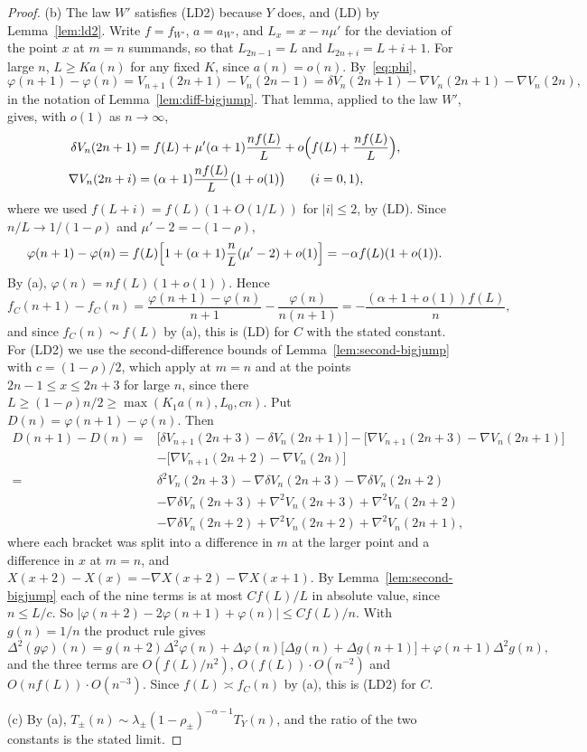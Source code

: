 \begin{proof}
(b) The law $W'$ satisfies (LD2) because $Y$ does, and (LD) by Lemma~\ref{lem:ld2}. Write
$f=f_{W'}$, $a=a_{W'}$, and $L_x=x-n\mu'$ for the deviation of the point $x$ at $m=n$
summands, so that $L_{2n-1}=L$ and $L_{2n+i}=L+i+1$. For large $n$, $L\ge Ka(n)$ for any fixed
$K$, since $a(n)=o(n)$. By~\eqref{eq:phi},
\[
 \varphi(n+1)-\varphi(n)=V_{n+1}(2n+1)-V_n(2n-1)
 =\delta V_n(2n+1)-\nabla V_n(2n+1)-\nabla V_n(2n),
\]
in the notation of Lemma~\ref{lem:diff-bigjump}. That lemma, applied to the law $W'$, gives,
with $o(1)$ as $n\to\infty$,
\begin{align*}
 \delta V_n(2n+1)&=f(L)+\mu'(\alpha+1)\frac{nf(L)}L+o\Bigl(f(L)+\frac{nf(L)}L\Bigr),\\
 \nabla V_n(2n+i)&=(\alpha+1)\frac{nf(L)}L\bigl(1+o(1)\bigr)\qquad(i=0,1),
\end{align*}
where we used $f(L+i)=f(L)(1+O(1/L))$ for $|i|\le2$, by (LD). Since $n/L\to1/(1-\rho)$ and
$\mu'-2=-(1-\rho)$,
\[
 \varphi(n+1)-\varphi(n)=f(L)\Bigl[1+(\alpha+1)\frac nL(\mu'-2)+o(1)\Bigr]=-\alpha f(L)(1+o(1)).
\]
By (a), $\varphi(n)=nf(L)(1+o(1))$. Hence
\[
 f_C(n+1)-f_C(n)=\frac{\varphi(n+1)-\varphi(n)}{n+1}-\frac{\varphi(n)}{n(n+1)}
 =-\frac{(\alpha+1+o(1))f(L)}{n},
\]
and since $f_C(n)\sim f(L)$ by (a), this is (LD) for $C$ with the stated constant. For (LD2) we use the second-difference bounds
of Lemma~\ref{lem:second-bigjump} with $c=(1-\rho)/2$, which apply at $m=n$ and at the points
$2n-1\le x\le2n+3$ for large $n$, since there $L\ge(1-\rho)n/2\ge\max(K_1a(n),L_0,cn)$. Put $D(n)=\varphi(n+1)-\varphi(n)$. Then
\begin{align*}
 D(n+1)-D(n)={}&\bigl[\delta V_{n+1}(2n+3)-\delta V_n(2n+1)\bigr]
 -\bigl[\nabla V_{n+1}(2n+3)-\nabla V_n(2n+1)\bigr]\\
 &-\bigl[\nabla V_{n+1}(2n+2)-\nabla V_n(2n)\bigr]\\
 ={}&\delta^2V_n(2n+3)-\nabla\delta V_n(2n+3)-\nabla\delta V_n(2n+2)\\
 &-\nabla\delta V_n(2n+3)+\nabla^2V_n(2n+3)+\nabla^2V_n(2n+2)\\
 &-\nabla\delta V_n(2n+2)+\nabla^2V_n(2n+2)+\nabla^2V_n(2n+1),
\end{align*}
where each bracket was split into a difference in $m$ at the larger point and a difference in
$x$ at $m=n$, and $X(x+2)-X(x)=-\nabla X(x+2)-\nabla X(x+1)$. By Lemma~\ref{lem:second-bigjump}
each of the nine terms is at most $Cf(L)/L$ in absolute value, since $n\le L/c$. So
$|\varphi(n+2)-2\varphi(n+1)+\varphi(n)|\le Cf(L)/n$. With $g(n)=1/n$ the product rule gives
\[
 \Delta^2(g\varphi)(n)=g(n+2)\Delta^2\varphi(n)+\Delta\varphi(n)\bigl[\Delta g(n)+\Delta g(n+1)\bigr]+\varphi(n+1)\Delta^2g(n),
\]
and the three terms are $O(f(L)/n^2)$, $O(f(L))\cdot O(n^{-2})$ and $O(nf(L))\cdot O(n^{-3})$. Since
$f(L)\asymp f_C(n)$ by (a), this is (LD2) for $C$.

(c) By (a), $T_\pm(n)\sim\lambda_\pm(1-\rho_\pm)^{-\alpha-1}T_Y(n)$, and the ratio of the two
constants is the stated limit.
\end{proof}

